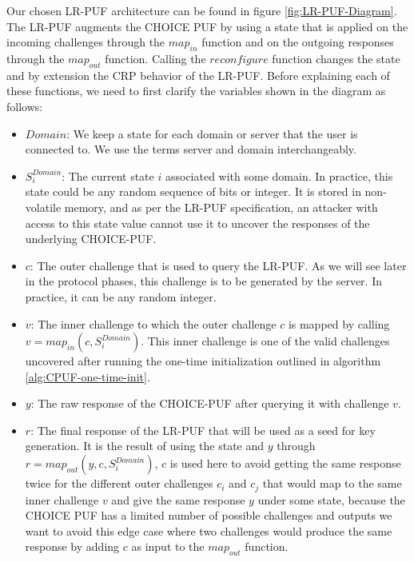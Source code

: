 Our chosen LR-PUF architecture can be found in figure \ref{fig:LR-PUF-Diagram}. The LR-PUF augments the CHOICE PUF by using a state that is applied on the incoming challenges through the $map_{in}$ function and on the outgoing responses through the $map_{out}$ function. Calling the $reconfigure$ function changes the state and by extension the CRP behavior of the LR-PUF. Before explaining each of these functions, we need to first clarify the variables shown in the diagram as follows:
\begin{itemize}
    \item $Domain$: We keep a state for each domain or server that the user is connected to. We use the terms server and domain interchangeably.
    \item $S_i^{Domain}$: The current state $i$ associated with some domain. In practice, this state could be any random sequence of bits or integer. It is stored in non-volatile memory, and as per the LR-PUF specification, an attacker with access to this state value cannot use it to uncover the responses of the underlying CHOICE-PUF.
    \item $c$: The outer challenge that is used to query the LR-PUF. As we will see later in the protocol phases, this challenge is to be generated by the server. In practice, it can be any random integer.
    \item $v$: The inner challenge to which the outer challenge $c$ is mapped by calling $v = map_{in}(c, S_i^{Domain})$. This inner challenge is one of the valid challenges uncovered after running the one-time initialization outlined in algorithm \ref{alg:CPUF-one-time-init}. 
    \item $y$: The raw response of the CHOICE-PUF after querying it with challenge $v$.
    \item $r$: The final response of the LR-PUF that will be used as a seed for key generation. It is the result of using the state and $y$ through $r = map_{out}(y, c, S_i^{Domain})$, $c$ is used here to avoid getting the same response twice for the different outer challenges $c_i$ and $c_j$ that would map to the same inner challenge $v$ and give the same response $y$ under some state, because the CHOICE PUF has a limited number of possible challenges and outputs we want to avoid this edge case where two challenges would produce the same response by adding $c$ as input to the $map_{out}$ function.
\end{itemize}

